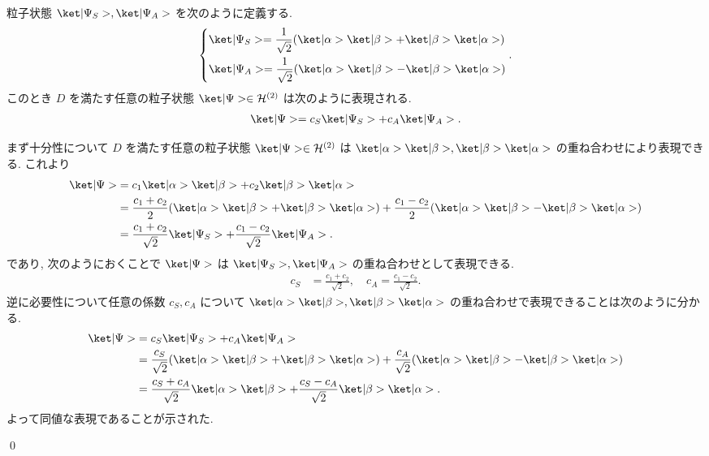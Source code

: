 \documentclass[uplatex,dvipdfmx,a4paper,11pt]{jlreq}
\makeatletter
\newcommand{\HH}{\mathcal{H}}
\numberwithin{equation}{section}
\theoremstyle{definition}
\renewenvironment{proof}[1][\proofname]{\par
  \normalfont
  \topsep6\p@\@plus6\p@ \trivlist
  \item[\hskip\labelsep{\bfseries #1}\@addpunct{\bfseries}]\ignorespaces\quad\par
}{
  \qed\endtrivlist\@endpefalse
}
\renewcommand\proofname{証明}
\makeatother
\begin{document}
\begin{proposition}[Q21-1(ii)]
  粒子状態 $\ket|\Psi_S>, \ket|\Psi_A>$ を次のように定義する.
  \begin{align}
    \begin{dcases}
      \ket|\Psi_S> = \frac{1}{\sqrt{2}}(\ket|\alpha>\ket|\beta> + \ket|\beta>\ket|\alpha>) \\
      \ket|\Psi_A> = \frac{1}{\sqrt{2}}(\ket|\alpha>\ket|\beta> - \ket|\beta>\ket|\alpha>)
    \end{dcases}.
  \end{align}
  このとき $D$ を満たす任意の粒子状態 $\ket|\Psi>\in\HH^{(2)}$ は次のように表現される.
  \begin{align}
    \ket|\Psi> = c_S\ket|\Psi_S> + c_A\ket|\Psi_A>.
  \end{align}
\end{proposition}
\begin{proof}
  まず十分性について $D$ を満たす任意の粒子状態 $\ket|\Psi>\in\HH^{(2)}$ は $\ket|\alpha>\ket|\beta>, \ket|\beta>\ket|\alpha>$ の重ね合わせにより表現できる. これより
  \begin{align}
    \ket|\Psi> & = c_1\ket|\alpha>\ket|\beta> + c_2\ket|\beta>\ket|\alpha>                                                                                         \\
               & = \frac{c_1 + c_2}{2}(\ket|\alpha>\ket|\beta> + \ket|\beta>\ket|\alpha>) + \frac{c_1 - c_2}{2}(\ket|\alpha>\ket|\beta> - \ket|\beta>\ket|\alpha>) \\
               & = \frac{c_1 + c_2}{\sqrt{2}}\ket|\Psi_S> + \frac{c_1 - c_2}{\sqrt{2}}\ket|\Psi_A>.
  \end{align}
  であり, 次のようにおくことで $\ket|\Psi>$ は $\ket|\Psi_S>, \ket|\Psi_A>$ の重ね合わせとして表現できる.
  \begin{align}
    c_S & = \frac{c_1 + c_2}{\sqrt{2}}, \quad c_A = \frac{c_1 - c_2}{\sqrt{2}}.
  \end{align}
  逆に必要性について任意の係数 $c_S, c_A$ について $\ket|\alpha>\ket|\beta>, \ket|\beta>\ket|\alpha>$ の重ね合わせで表現できることは次のように分かる.
  \begin{align}
    \ket|\Psi> & = c_S\ket|\Psi_S> + c_A\ket|\Psi_A>                                                                                                                 \\
               & = \frac{c_S}{\sqrt{2}}(\ket|\alpha>\ket|\beta> + \ket|\beta>\ket|\alpha>) + \frac{c_A}{\sqrt{2}}(\ket|\alpha>\ket|\beta> - \ket|\beta>\ket|\alpha>) \\
               & = \frac{c_S + c_A}{\sqrt{2}}\ket|\alpha>\ket|\beta> + \frac{c_S - c_A}{\sqrt{2}}\ket|\beta>\ket|\alpha>.
  \end{align}
  よって同値な表現であることが示された.
\end{proof}
\end{document}
